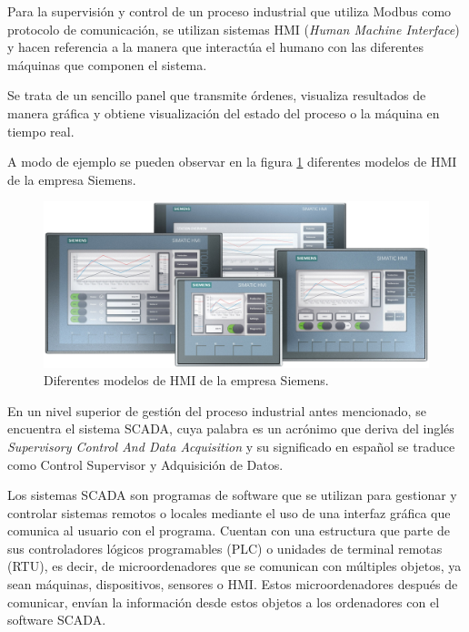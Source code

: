 
Para la supervisión y control de un proceso industrial que utiliza Modbus como protocolo de comunicación,  se utilizan sistemas HMI (\textit{Human Machine Interface}) y hacen referencia a la manera que interactúa el humano con las diferentes máquinas que componen el sistema. 

Se trata de un sencillo panel que transmite órdenes, visualiza resultados de manera gráfica y obtiene visualización del estado del proceso o la máquina en tiempo real.  

A modo de ejemplo se pueden observar en la figura \ref{fig:hmi-siemens} diferentes modelos de HMI de la empresa Siemens. 

\begin{figure}[htpb]
	\centering
	\includegraphics[scale=.10]{./Figures/hmi-ejemplos.jpg}
	\caption[Diferentes modelos de HMI de la empresa Siemens]{Diferentes modelos de HMI de la empresa Siemens\protect\footnotemark.}
	\label{fig:hmi-siemens}
\end{figure}


En un nivel superior de gestión del proceso industrial antes mencionado, se encuentra el sistema SCADA,  cuya palabra es un acrónimo que deriva del inglés  \textit{Supervisory Control And Data Acquisition} y su significado en español se traduce como Control Supervisor y Adquisición de Datos.

Los sistemas SCADA son programas de software que se utilizan para gestionar y controlar sistemas remotos o locales mediante el uso de una interfaz gráfica que comunica al usuario con el programa.  Cuentan con una estructura que parte de sus controladores lógicos programables (PLC) o unidades de terminal remotas (RTU)\citep{BOOK:1}, es decir, de microordenadores que se comunican con múltiples objetos, ya sean máquinas, dispositivos, sensores o HMI. Estos microordenadores después de comunicar, envían la información desde estos objetos a los ordenadores con el software SCADA.  

